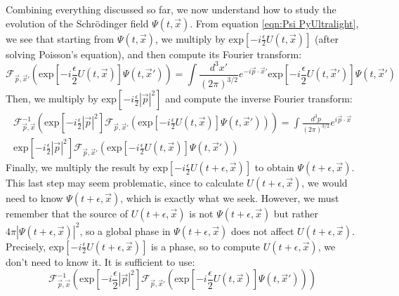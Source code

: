 \documentclass[12pt]{article}
\begin{document}
Combining everything discussed so far, we now understand how to study the evolution of the Schrödinger field \( \Psi(t,\vec{x}) \). From equation \ref{eqn:Psi PyUltralight}, we see that starting from \( \Psi(t,\vec{x}) \), we multiply by \( \text{exp}\left[-i\frac{\epsilon}{2}U(t,\vec{x}) \right] \) (after solving Poisson’s equation), and then compute its Fourier transform:
\begin{equation}
    \mathcal{F}_{\vec{p},\vec{x}'}\left(\text{exp}\left[ -i\frac{\epsilon}{2}U(t,\vec{x})\right] \Psi(t,\vec{x}') \right)=\int \frac{d^{3}x'}{(2\pi)^{3/2}}e^{-i\vec{p}\cdot \vec{x}'}\text{exp}\left[ -i\frac{\epsilon}{2}U(t,\vec{x}')\right] \Psi(t,\vec{x}')
\end{equation}
Then, we multiply by \( \text{exp}\left[-i\frac{\epsilon}{2}|\vec{p}|^2 \right] \) and compute the inverse Fourier transform:
\begin{multline}
    \mathcal{F}_{\vec{p},\vec{x}}^{-1}\left( \text{exp}\left[-i\frac{\epsilon}{2}|\vec{p}|^2 \right]\mathcal{F}_{\vec{p},\vec{x}'}\left(\text{exp}\left[ -i\frac{\epsilon}{2}U(t,\vec{x})\right] \Psi(t,\vec{x}') \right) \right)=\int \frac{d^{3}p}{(2\pi)^{3/2}}e^{i\vec{p}\cdot \vec{x}} \\ \text{exp}\left[-i\frac{\epsilon}{2}|\vec{p}|^2 \right] \mathcal{F}_{\vec{p},\vec{x}'}\left(\text{exp}\left[ -i\frac{\epsilon}{2}U(t,\vec{x})\right] \Psi(t,\vec{x}') \right)
\end{multline}
Finally, we multiply the result by \( \text{exp}\left[ -i\frac{\epsilon}{2}U(t+\epsilon,\vec{x})\right] \) to obtain \( \Psi(t+\epsilon,\vec{x}) \).\\
This last step may seem problematic, since to calculate \( U(t+\epsilon,\vec{x}) \), we would need to know \( \Psi(t+\epsilon,\vec{x}) \), which is exactly what we seek. However, we must remember that the source of \( U(t+\epsilon,\vec{x}) \) is not \( \Psi(t+\epsilon,\vec{x}) \) but rather \( 4\pi |\Psi(t+\epsilon,\vec{x})|^2 \), so a global phase in \( \Psi(t+\epsilon,\vec{x}) \) does not affect \( U(t+\epsilon,\vec{x}) \). Precisely, \( \text{exp}\left[-i\frac{\epsilon}{2}U(t+\epsilon,\vec{x}) \right] \) is a phase, so to compute \( U(t+\epsilon,\vec{x}) \), we don’t need to know it. It is sufficient to use:
\begin{equation}
    \mathcal{F}_{\vec{p},\vec{x}}^{-1}\left( \text{exp}\left[-i\frac{\epsilon}{2}|\vec{p}|^2 \right]\mathcal{F}_{\vec{p},\vec{x}'}\left(\text{exp}\left[ -i\frac{\epsilon}{2}U(t,\vec{x})\right] \Psi(t,\vec{x}') \right) \right)
\end{equation}
\end{document}
